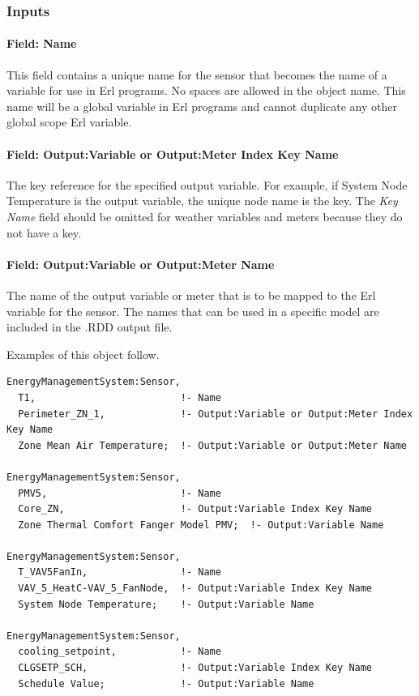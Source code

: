 \subsubsection{Inputs}\label{inputs-015}

\paragraph{Field: Name}\label{field-name-014}

This field contains a unique name for the sensor that becomes the name of a variable for use in Erl programs. No spaces are allowed in the object name. This name will be a global variable in Erl programs and cannot duplicate any other global scope Erl variable.

\paragraph{Field: Output:Variable or Output:Meter Index Key Name}\label{field-outputvariable-or-outputmeter-index-key-name}

The key reference for the specified output variable. For example, if System Node Temperature is the output variable, the unique node name is the key. The \emph{Key Name} field should be omitted for weather variables and meters because they do not have a key.

\paragraph{Field: Output:Variable or Output:Meter Name}\label{field-outputvariable-or-outputmeter-name}

The name of the output variable or meter that is to be mapped to the Erl variable for the sensor. The names that can be used in a specific model are included in the .RDD output file.

Examples of this object follow.

\begin{lstlisting}
EnergyManagementSystem:Sensor,
  T1,                         !- Name
  Perimeter_ZN_1,             !- Output:Variable or Output:Meter Index Key Name
  Zone Mean Air Temperature;  !- Output:Variable or Output:Meter Name

EnergyManagementSystem:Sensor,
  PMV5,                       !- Name
  Core_ZN,                    !- Output:Variable Index Key Name
  Zone Thermal Comfort Fanger Model PMV;  !- Output:Variable Name

EnergyManagementSystem:Sensor,
  T_VAV5FanIn,                !- Name
  VAV_5_HeatC-VAV_5_FanNode,  !- Output:Variable Index Key Name
  System Node Temperature;    !- Output:Variable Name

EnergyManagementSystem:Sensor,
  cooling_setpoint,           !- Name
  CLGSETP_SCH,                !- Output:Variable Index Key Name
  Schedule Value;             !- Output:Variable Name
\end{lstlisting}

